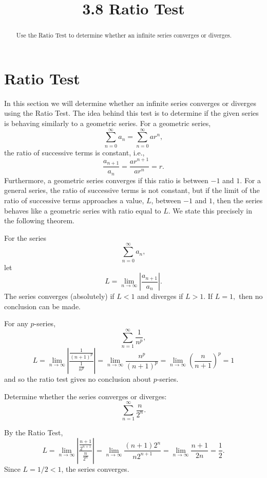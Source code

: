 \documentclass{ximera}
\title{3.8 Ratio Test}
\begin{document}
\begin{abstract}
Use the Ratio Test to determine whether an infinite series converges or diverges.
\end{abstract}

\maketitle

\section{Ratio Test}

In this section we will determine whether an infinite series converges or diverges using the Ratio Test. 
The idea behind this test is to determine if the given series is behaving similarly to a geometric series.
For a geometric series, 
\[
\sum_{n=0}^\infty a_n = \sum_{n=0}^\infty ar^n,
\]
the ratio of successive terms is constant, i.e., 
\[
\frac{a_{n+1}}{a_n} = \frac{ar^{n+1}}{ar^n} = r.
\]
Furthermore, a geometric series converges if this ratio is between $-1$ and $1$.
For a general series, the ratio of successive terms is not constant, but if the limit of the ratio of successive terms
approaches a value, $L$, between $-1$ and $1$, then the series behaves like a geometric series with ratio equal to $L$.
We state this precisely in the following theorem.

\begin{theorem}
For the series
\[
\sum_{n=0}^\infty a_n,
\]
let
\[
L = \lim_{n \to \infty} \left|\frac{a_{n+1}}{a_n}\right|.
\]
The series converges (absolutely) if $L < 1$ and diverges if $L>1$. 
If $L = 1,$ then no conclusion can be made.

\end{theorem}
 
\begin{remark}
For any $p$-series,
\[
\sum_{n=1}^\infty \frac{1}{n^p},
\]
\[
L =  \lim_{n \to \infty} \left|\frac{\frac{1}{(n+1)^p}}{\frac{1}{n^p}}\right| = \lim_{n \to \infty} \frac{n^p}{(n+1)^p} =  \lim_{n \to \infty} \left(\frac{n}{n+1}\right)^p = 1
\]
and so the ratio test gives no conclusion about $p$-series.
\end{remark}

\begin{example}[example 1]
Determine whether the series converges or diverges:
\[
\sum_{n=1}^\infty \frac{n}{2^n}.
\]

By the Ratio Test,
\[
L =  \lim_{n \to \infty} \left|\frac{\frac{n+1}{2^{n+1}}}{\frac{n}{2^n}}\right| =  \lim_{n \to \infty} \frac{(n+1)2^n}{n2^{n+1}} 
=  \lim_{n \to \infty} \frac{n+1}{2n} = \frac12.
\]
Since $L = 1/2 < 1$, the series converges.
\end{example}
\end{document}
